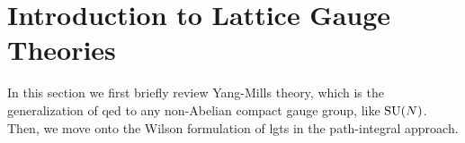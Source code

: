 \chapter{Introduction to Lattice Gauge Theories}
\label{chap:introduction_to_lattice_gauge_theories}

In this section we first briefly review Yang-Mills theory, which is the generalization of \ac{qed} to any non-Abelian compact gauge group, like $\text{SU}(N)$.
Then, we move onto the Wilson formulation of \acp{lgt} in the path-integral approach.





